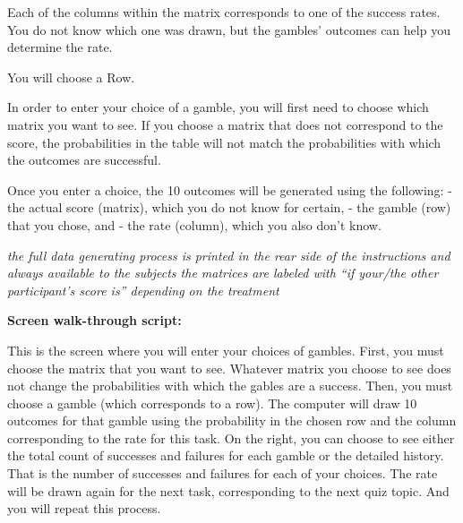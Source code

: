 \documentclass[
  12pt,
]{article}
\begin{document}
Each of the columns within the matrix corresponds to one of the success
rates. You do not know which one was drawn, but the gambles' outcomes
can help you determine the rate.

You will choose a Row.

In order to enter your choice of a gamble, you will first need to choose
which matrix you want to see. If you choose a matrix that does not
correspond to the score, the probabilities in the table will not match
the probabilities with which the outcomes are successful.

Once you enter a choice, the 10 outcomes will be generated using the
following: - the actual score (matrix), which you do not know for
certain, - the gamble (row) that you chose, and - the rate (column),
which you also don't know.

\emph{the full data generating process is printed in the rear side of
the instructions and always available to the subjects the matrices are
labeled with ``if your/the other participant's score is'' depending on
the treatment}

\textbf{Screen walk-through script:}

This is the screen where you will enter your choices of gambles. First,
you must choose the matrix that you want to see. Whatever matrix you
choose to see does not change the probabilities with which the gables
are a success. Then, you must choose a gamble (which corresponds to a
row). The computer will draw 10 outcomes for that gamble using the
probability in the chosen row and the column corresponding to the rate
for this task. On the right, you can choose to see either the total
count of successes and failures for each gamble or the detailed history.
That is the number of successes and failures for each of your choices.
The rate will be drawn again for the next task, corresponding to the
next quiz topic. And you will repeat this process.

\renewcommand\refname{References}
  
\end{document}

